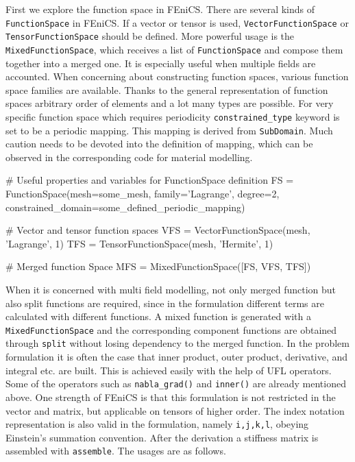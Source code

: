 \documentclass[10pt,a4paper]{scrreprt}
\begin{document}
First we explore the function space in FEniCS. There are several kinds of \texttt{FunctionSpace} in FEniCS. If a vector or tensor is used, \texttt{VectorFunctionSpace} or \texttt{TensorFunctionSpace} should be defined. More powerful usage is the \texttt{MixedFunctionSpace}, which receives a list of \texttt{FunctionSpace} and compose them together into a merged one. It is especially useful when multiple fields are accounted. When concerning about constructing function spaces, various function space families are available. Thanks to the general representation of function spaces arbitrary order of elements and a lot many types are possible. For very specific function space which requires periodicity \texttt{constrained\_type} keyword is set to be a periodic mapping. This mapping is derived from \texttt{SubDomain}. Much caution needs to be devoted into the definition of mapping, which can be observed in the corresponding code for material modelling.

\begin{python}
# Useful properties and variables for FunctionSpace definition
FS = FunctionSpace(mesh=some_mesh, family='Lagrange', degree=2, constrained_domain=some_defined_periodic_mapping)

# Vector and tensor function spaces
VFS = VectorFunctionSpace(mesh, 'Lagrange', 1)
TFS = TensorFunctionSpace(mesh, 'Hermite', 1)

# Merged function Space
MFS = MixedFunctionSpace([FS, VFS, TFS])
\end{python}

When it is concerned with multi field modelling, not only merged function but also split functions are required, since in the formulation different terms are calculated with different functions. A mixed function is generated with a \texttt{MixedFunctionSpace} and the corresponding component functions are obtained through \texttt{split} without losing dependency to the merged function. In the problem formulation it is often the case that inner product, outer product, derivative, and integral etc. are built. This is achieved easily with the help of UFL operators. Some of the operators such as \texttt{nabla\_grad()} and \texttt{inner()} are already mentioned above. One strength of FEniCS is that this formulation is not restricted in the vector and matrix, but applicable on tensors of higher order. The index notation representation is also valid in the formulation, namely \texttt{i,j,k,l}, obeying Einstein's summation convention. After the derivation a stiffness matrix is assembled with \texttt{assemble}. The usages are as follows.
\end{document}

